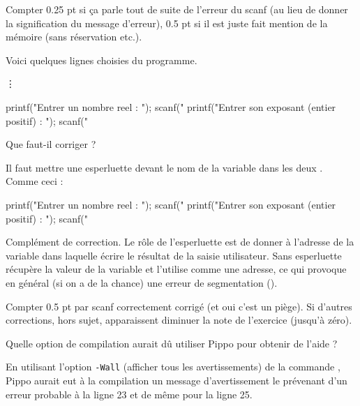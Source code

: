 \begin{baremeenv}
  Compter 0.25 pt si ça parle tout de suite de l'erreur du scanf (au lieu de donner la signification du message d'erreur), 0.5 pt si il est juste fait mention de la mémoire (sans réservation etc.).
\end{baremeenv}

\medskip
Voici quelques lignes choisies du programme.
\begin{listing}{10}
int main()
{
    /* Déclaration et initialisation des variables */
   double x;
   int n;
\end{listing}
\vdots
\begin{listing}{22}
    printf("Entrer un nombre reel : ");
    scanf("%
    printf("Entrer son exposant (entier positif) : ");
    scanf("%
\end{listing}

\question
Que faut-il corriger ? 

\begin{correction}
Il faut mettre une esperluette devant le nom de la variable dans les deux .
 Comme ceci :
  \begin{listing}{22}
    printf("Entrer un nombre reel : ");
    scanf("%
    printf("Entrer son exposant (entier positif) : ");
    scanf("%
\end{listing}

Complément de correction.
Le rôle de l'esperluette est de donner à  l'adresse de la variable dans laquelle écrire le résultat de la saisie utilisateur. Sans esperluette  récupère la valeur de la variable et l'utilise comme une adresse, ce qui provoque en général (si on a de la chance) une erreur de segmentation (). 
\end{correction}

\begin{baremeenv}
  Compter 0.5 pt par scanf correctement corrigé (et oui c'est un piège). Si d'autres corrections, hors sujet, apparaissent diminuer la note de l'exercice (jusqu'à zéro).
\end{baremeenv}


\question
 Quelle option de compilation aurait dû utiliser Pippo pour obtenir de
  l'aide ?

\begin{correction}
En utilisant l'option \verb+-Wall+ (afficher tous les avertissements) de la commande , Pippo aurait eut à la compilation un message d'avertissement le prévenant d'un erreur probable à la ligne 23 et de même pour la ligne 25.
\end{correction}

